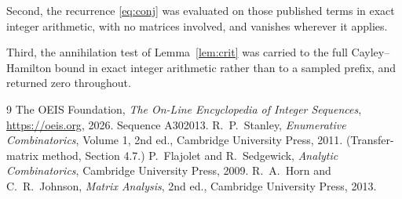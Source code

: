 \documentclass[11pt,a4paper]{article}
\theoremstyle{plain}
\theoremstyle{definition}
\begin{document}
Second, the recurrence \eqref{eq:conj} was evaluated on those published terms in exact
integer arithmetic, with no matrices involved, and vanishes wherever it applies.

Third, the annihilation test of Lemma~\ref{lem:crit} was carried to the full
Cayley--Hamilton bound in exact integer arithmetic rather than to a sampled prefix, and
returned zero throughout.

\begin{thebibliography}{9}
 The OEIS Foundation, \emph{The On-Line Encyclopedia of Integer
Sequences}, \url{https://oeis.org}, 2026. Sequence A302013.
 R.~P.~Stanley, \emph{Enumerative Combinatorics}, Volume 1, 2nd ed.,
Cambridge University Press, 2011. (Transfer-matrix method, Section 4.7.)
 P.~Flajolet and R.~Sedgewick, \emph{Analytic Combinatorics}, Cambridge
University Press, 2009.
 R.~A.~Horn and C.~R.~Johnson, \emph{Matrix Analysis}, 2nd ed., Cambridge
University Press, 2013.
\end{thebibliography}
\end{document}
